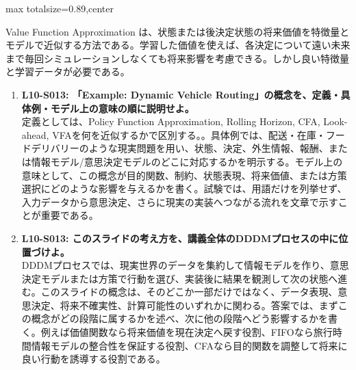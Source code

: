 \begin{minipage}[t]{0.58\textwidth}
\begin{adjustbox}{max totalsize={\textwidth}{0.89\textheight},center}
\begin{minipage}{\textwidth}
Value Function Approximation は、状態または後決定状態の将来価値を特徴量とモデルで近似する方法である。学習した価値を使えば、各決定について遠い未来まで毎回シミュレーションしなくても将来影響を考慮できる。しかし良い特徴量と学習データが必要である。\par{}\begin{enumerate}\item \textbf{L10-S013: 「Example: Dynamic Vehicle Routing」の概念を、定義・具体例・モデル上の意味の順に説明せよ。}\\定義としては、Policy Function Approximation, Rolling Horizon, CFA, Look-ahead, VFAを何を近似するかで区別する。。具体例では、配送・在庫・フードデリバリーのような現実問題を用い、状態、決定、外生情報、報酬、または情報モデル/意思決定モデルのどこに対応するかを明示する。モデル上の意味として、この概念が目的関数、制約、状態表現、将来価値、または方策選択にどのような影響を与えるかを書く。試験では、用語だけを列挙せず、入力データから意思決定、さらに現実の実装へつながる流れを文章で示すことが重要である。\item \textbf{L10-S013: このスライドの考え方を、講義全体のDDDMプロセスの中に位置づけよ。}\\DDDMプロセスでは、現実世界のデータを集約して情報モデルを作り、意思決定モデルまたは方策で行動を選び、実装後に結果を観測して次の状態へ進む。このスライドの概念は、そのどこか一部だけではなく、データ表現、意思決定、将来不確実性、計算可能性のいずれかに関わる。答案では、まずこの概念がどの段階に属するかを述べ、次に他の段階へどう影響するかを書く。例えば価値関数なら将来価値を現在決定へ戻す役割、FIFOなら旅行時間情報モデルの整合性を保証する役割、CFAなら目的関数を調整して将来に良い行動を誘導する役割である。\end{enumerate}
\end{minipage}
\end{adjustbox}
\end{minipage}


